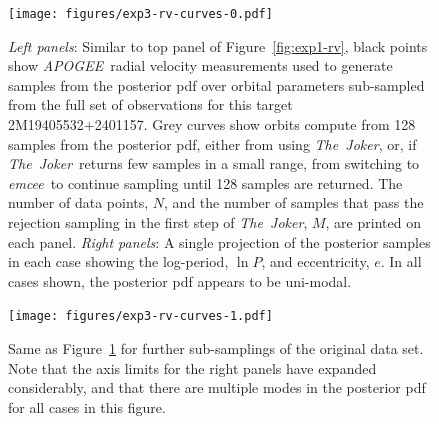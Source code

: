 \documentclass[manuscript, letterpaper]{aastex6}
\newcommand{\project}[1]{\textsl{#1}}
\newcommand{\acronym}[1]{{\small{#1}}}
\newcommand{\apogee}{\project{\acronym{APOGEE}}}
\newcommand{\samplername}{\project{The~Joker}}
\newcommand{\emcee}{\project{emcee}}
\newcommand{\figname}{Figure}
\begin{document}
\begin{figure}[p]
\begin{center}
\texttt{[image: figures/exp3-rv-curves-0.pdf]}
\end{center}
\caption{%
{\sl Left panels}: Similar to top panel of \figname~\ref{fig:exp1-rv}, black
points show \apogee\ radial velocity measurements used to generate samples from
the posterior pdf over orbital parameters sub-sampled from the full set of
observations for this target 2M19405532+2401157.
Grey curves show orbits compute from 128 samples from the posterior pdf, either
from using \samplername, or, if \samplername\ returns few samples in a small
range, from switching to \emcee\ to continue sampling until 128 samples are
returned.
The number of data points, $N$, and the number of samples that pass the
rejection sampling in the first step of \samplername, $M$, are printed on each
panel.
{\sl Right panels}: A single projection of the posterior samples in each case
showing the log-period, $\ln P$, and eccentricity, $e$.
In all cases shown, the posterior pdf appears to be uni-modal.
\label{fig:exp3-rv-0}}
\end{figure}

\begin{figure}[p]
\begin{center}
\texttt{[image: figures/exp3-rv-curves-1.pdf]}
\end{center}
\caption{%
Same as \figname~\ref{fig:exp3-rv-0} for further sub-samplings of the original
data set.
Note that the axis limits for the right panels have expanded considerably, and
that there are multiple modes in the posterior pdf for all cases in this figure.
\label{fig:exp3-rv-1}}
\end{figure}


\end{document}
